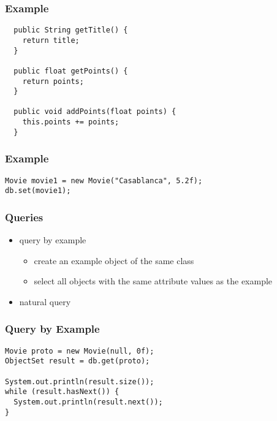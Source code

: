 \documentclass[dvipsnames]{beamer}
\theoremstyle{plain}
\begin{document}
\begin{frame}[fragile]
  \frametitle{Example}

  \begin{example}
    \begin{lstlisting}
  public String getTitle() {
    return title;
  }

  public float getPoints() {
    return points;
  }

  public void addPoints(float points) {
    this.points += points;
  }
    \end{lstlisting}
  \end{example}
\end{frame}

\begin{frame}[fragile]
  \frametitle{Example}

  \begin{example}
    \begin{lstlisting}
Movie movie1 = new Movie("Casablanca", 5.2f);
db.set(movie1);
    \end{lstlisting}
  \end{example}
\end{frame}

\begin{frame}
  \frametitle{Queries}

  \begin{itemize}
    \item query by example
    \begin{itemize}
      \item create an example object of the same class
      \item select all objects with the same attribute values as the example
    \end{itemize}

    \medskip
    \item natural query
  \end{itemize}
\end{frame}

\begin{frame}[fragile]
  \frametitle{Query by Example}

  \begin{example}
    \begin{lstlisting}
Movie proto = new Movie(null, 0f);
ObjectSet result = db.get(proto);

System.out.println(result.size());
while (result.hasNext()) {
  System.out.println(result.next());
}
    \end{lstlisting}
  \end{example}
\end{frame}
\end{document}
